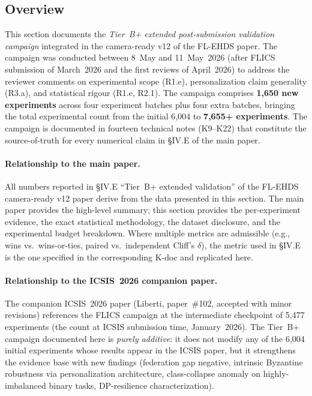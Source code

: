 \documentclass[conference]{IEEEtran}
\begin{document}
\subsection*{Overview}
\label{sec:tier_b_overview}

This section documents the \emph{Tier~B+ extended post-submission validation campaign} integrated in the camera-ready v12 of the FL-EHDS paper. The campaign was conducted between 8~May and 11~May~2026 (after FLICS submission of March~2026 and the first reviews of April~2026) to address the reviewer comments on experimental scope (R1.e), personalization claim generality (R3.a), and statistical rigour (R1.e, R2.1). The campaign comprises \textbf{1{,}650 new experiments} across four experiment batches plus four extra batches, bringing the total experimental count from the initial 6{,}004 to \textbf{7{,}655+ experiments}. The campaign is documented in fourteen technical notes (K9--K22) that constitute the source-of-truth for every numerical claim in §IV.E of the main paper.

\paragraph{Relationship to the main paper.} All numbers reported in §IV.E ``Tier~B+ extended validation'' of the FL-EHDS camera-ready v12 paper derive from the data presented in this section. The main paper provides the high-level summary; this section provides the per-experiment evidence, the exact statistical methodology, the dataset disclosure, and the experimental budget breakdown. Where multiple metrics are admissible (e.g., wins vs.\ wins-or-ties, paired vs.\ independent Cliff's $\delta$), the metric used in §IV.E is the one specified in the corresponding K-doc and replicated here.

\paragraph{Relationship to the ICSIS~2026 companion paper.} The companion ICSIS~2026 paper (Liberti, paper~\#102, accepted with minor revisions) references the FLICS campaign at the intermediate checkpoint of 5{,}477 experiments (the count at ICSIS submission time, January~2026). The Tier~B+ campaign documented here is \emph{purely additive}: it does not modify any of the 6{,}004 initial experiments whose results appear in the ICSIS paper, but it strengthens the evidence base with new findings (federation gap negative, intrinsic Byzantine robustness via personalization architecture, class-collapse anomaly on highly-imbalanced binary tasks, DP-resilience characterization).
\end{document}
